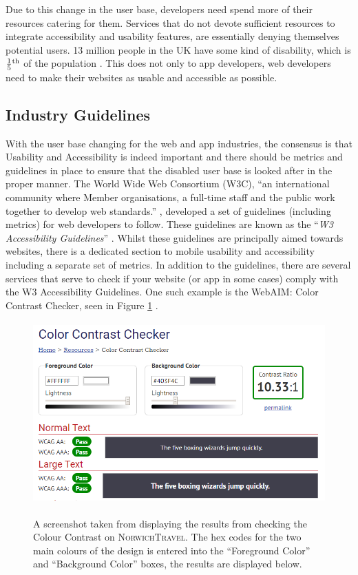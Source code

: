 \documentclass[cmpstyle]{ueacmpstyle}
\newcommand{\nt}{\textsc{NorwichTravel}}
\begin{document}
		Due to this change in the user base, developers need spend more of their resources catering for them. Services that do not devote sufficient resources to integrate accessibility and usability features, are essentially denying themselves potential users. 13 million people in the UK have some kind of disability, which is $\frac{1}{5}\textsuperscript{th}$ of the population \citep{disabledUK}. This does not only to app developers, web developers need to make their websites as usable and accessible as possible.
		
		\subsection{Industry Guidelines} \label{sec:industry}
		With the user base changing for the web and app industries, the consensus is that Usability and Accessibility is indeed important and there should be metrics and guidelines in place to ensure that the disabled user base is looked after in the proper manner. The World Wide Web Consortium (W3C), ``an international community where Member organisations, a full-time staff and the public work together to develop web standards.'' \citep{W3Cwho}, developed a set of guidelines (including metrics) for web developers to follow. These guidelines are known as the ``\textit{W3 Accessibility Guidelines}'' \citep{w3guide}. Whilst these guidelines are principally aimed towards websites, there is a dedicated section to mobile usability and accessibility including a separate set of metrics. In addition to the guidelines, there are several services that serve to check if your website (or app in some cases) comply with the W3 Accessibility Guidelines. One such example is the WebAIM: Color Contrast Checker, seen in Figure \ref{fig:contrast-check} \citep{contrast-check}.
		
		\begin{figure}
			\centering
			\includegraphics[height=7cm]{images/contrast-checker.png}\\
			\caption{A screenshot taken from \citep{contrast-check} displaying the results from checking the Colour Contrast on \nt. The hex codes for the two main colours of the design is entered into the ``Foreground Color'' and ``Background Color'' boxes, the results are displayed below.}\label{fig:contrast-check}
		\end{figure}
		
\end{document}
